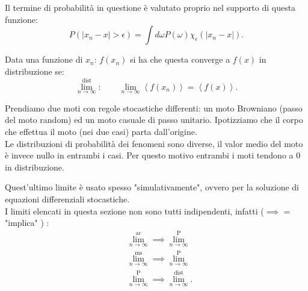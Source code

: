 \usetikzlibrary{math}
\begin{center}
\end{center}
\noindent
Il termine di probabilità in questione è valutato proprio nel supporto di questa funzione:
\[
    P(\left|x_n-x\right|>\epsilon) = \int d\omega P(\omega) \chi_\epsilon (\left|x_n-x\right|) 
.\] 
\begin{defn}[\textcolor{red}{Limite in distribuzione}]
    Data una funzione di $x_n$: $f(x_n)$ si ha che questa converge a $f(x)$ in distribuzione se:
    \[
	\lim^{\text{dist}}_{n \to \infty}: \qquad \lim_{n \to \infty} \left<f(x_n)\right> = \left<f(x)\right>
    .\] 
\end{defn}
\begin{exmp}
    Prendiamo due moti con regole stocastiche differenti: un moto Browniano (passo del moto random) ed un moto casuale di passo unitario.
    Ipotizziamo che il corpo che effettua il moto (nei due casi) parta dall'origine.\\
    Le distribuzioni di probabilità dei fenomeni sono diverse, il valor medio del moto è invece nullo in entrambi i casi. Per questo motivo entrambi i moti tendono a 0 in distribuzione.
\end{exmp}
\noindent
Quest'ultimo limite è usato spesso "simulativamente", ovvero per la soluzione di equazioni differenziali stocastiche.\\
I limiti elencati in questa sezione non sono tutti indipendenti, infatti ($\implies$ = "implica" ) :
\[\begin{aligned}
    & \lim^{\text{ac}}_{n \to \infty} \implies  \lim^{\text{P}}_{n \to \infty} \\
    & \lim^{\text{ms}}_{n \to \infty} \implies  \lim^{\text{P}}_{n \to \infty} \\
    & \lim^{\text{P}}_{n \to \infty} \implies \lim^{\text{dist}}_{n \to \infty}  
.\end{aligned}\]


\clearpage
